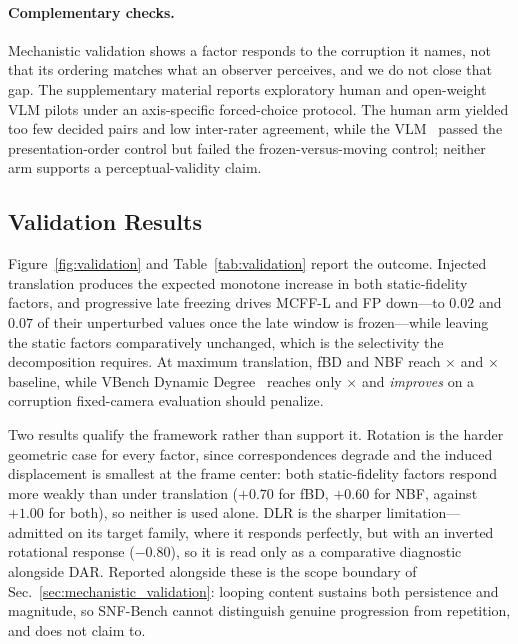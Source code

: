 \paragraph{Complementary checks.}
Mechanistic validation shows a factor responds to the corruption it names, not that its ordering matches what an observer perceives, and we do not close that gap. The supplementary material reports exploratory human and open-weight VLM pilots under an axis-specific forced-choice protocol. The human arm yielded too few decided pairs and low inter-rater agreement, while the VLM~\cite{qwen3vl2025} passed the presentation-order control but failed the frozen-versus-moving control; neither arm supports a perceptual-validity claim.

\subsection{Validation Results}
\label{sec:validation_results}

Figure~\ref{fig:validation} and Table~\ref{tab:validation} report the outcome. Injected translation produces the expected monotone increase in both static-fidelity factors, and progressive late freezing drives MCFF-L and FP down---to $0.02$ and $0.07$ of their unperturbed values once the late window is frozen---while leaving the static factors comparatively unchanged, which is the selectivity the decomposition requires. At maximum translation, fBD and NBF reach \SNFvalTranslationFBDRatio$\times$ and \SNFvalTranslationNBFRatio$\times$ baseline, while VBench Dynamic Degree~\cite{huang2023vbench} reaches only \SNFvalTranslationDDRatio$\times$ and \emph{improves} on a corruption fixed-camera evaluation should penalize.

Two results qualify the framework rather than support it. Rotation is the harder geometric case for every factor, since correspondences degrade and the induced displacement is smallest at the frame center: both static-fidelity factors respond more weakly than under translation ($+0.70$ for fBD, $+0.60$ for NBF, against $+1.00$ for both), so neither is used alone. DLR is the sharper limitation---admitted on its target family, where it responds perfectly, but with an inverted rotational response ($-0.80$), so it is read only as a comparative diagnostic alongside DAR. Reported alongside these is the scope boundary of Sec.~\ref{sec:mechanistic_validation}: looping content sustains both persistence and magnitude, so SNF-Bench cannot distinguish genuine progression from repetition, and does not claim to.

